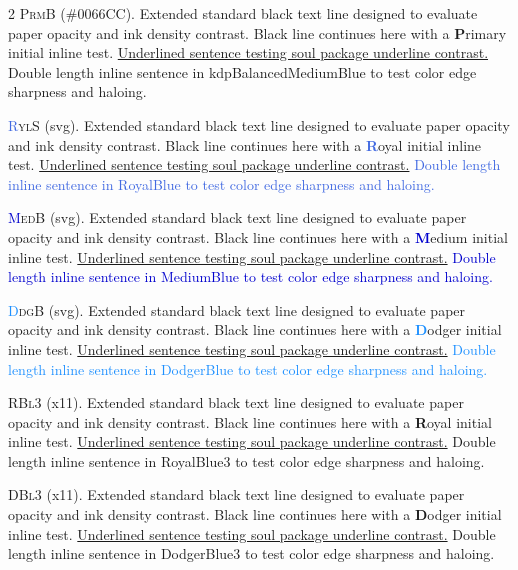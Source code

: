 \documentclass[9pt]{article}
\let\oldlettrine\lettrine
\renewcommand{\lettrine}[3][]{%
	\clubpenalty=10000
	\oldlettrine[#1]{#2}{#3}%
}
\begin{document}
\begin{multicols}{2}
\lettrine[lines=2]{\textcolor{kdpBalancedMediumBlue}{P}}{rmB} (\#0066CC). Extended standard black text line designed to evaluate paper opacity and ink density contrast. Black line continues here with a \textbf{\textcolor{kdpBalancedMediumBlue}{P}}rimary initial inline test. \ul{Underlined sentence testing soul package underline contrast.} \textcolor{kdpBalancedMediumBlue}{Double length inline sentence in kdpBalancedMediumBlue to test color edge sharpness and haloing.}
\medskip

\lettrine[lines=2]{\textcolor{RoyalBlue}{R}}{ylS} (svg). Extended standard black text line designed to evaluate paper opacity and ink density contrast. Black line continues here with a \textbf{\textcolor{RoyalBlue}{R}}oyal initial inline test. \ul{Underlined sentence testing soul package underline contrast.} \textcolor{RoyalBlue}{Double length inline sentence in RoyalBlue to test color edge sharpness and haloing.}
\medskip

\lettrine[lines=2]{\textcolor{MediumBlue}{M}}{edB} (svg). Extended standard black text line designed to evaluate paper opacity and ink density contrast. Black line continues here with a \textbf{\textcolor{MediumBlue}{M}}edium initial inline test. \ul{Underlined sentence testing soul package underline contrast.} \textcolor{MediumBlue}{Double length inline sentence in MediumBlue to test color edge sharpness and haloing.}
\medskip

\lettrine[lines=2]{\textcolor{DodgerBlue}{D}}{dgB} (svg). Extended standard black text line designed to evaluate paper opacity and ink density contrast. Black line continues here with a \textbf{\textcolor{DodgerBlue}{D}}odger initial inline test. \ul{Underlined sentence testing soul package underline contrast.} \textcolor{DodgerBlue}{Double length inline sentence in DodgerBlue to test color edge sharpness and haloing.}
\medskip

\lettrine[lines=2]{\textcolor{RoyalBlue3}{R}}{Bl3} (x11). Extended standard black text line designed to evaluate paper opacity and ink density contrast. Black line continues here with a \textbf{\textcolor{RoyalBlue3}{R}}oyal initial inline test. \ul{Underlined sentence testing soul package underline contrast.} \textcolor{RoyalBlue3}{Double length inline sentence in RoyalBlue3 to test color edge sharpness and haloing.}
\medskip

\lettrine[lines=2]{\textcolor{DodgerBlue3}{D}}{Bl3} (x11). Extended standard black text line designed to evaluate paper opacity and ink density contrast. Black line continues here with a \textbf{\textcolor{DodgerBlue3}{D}}odger initial inline test. \ul{Underlined sentence testing soul package underline contrast.} \textcolor{DodgerBlue3}{Double length inline sentence in DodgerBlue3 to test color edge sharpness and haloing.}
\medskip


\end{multicols}
\end{document}
